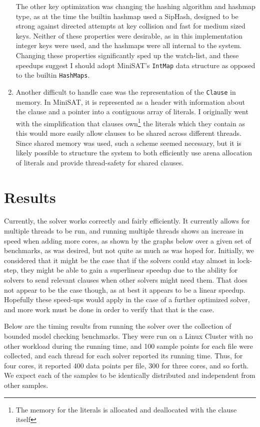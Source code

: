 \documentclass[11pt]{extarticle}
\begin{document}
\begin{enumerate}
The other key optimization was changing the hashing algorithm and hashmap type, as at the time
the builtin hashmap used a SipHash, designed to be strong against directed attempts at key
collision and fast for medium sized keys. Neither of these properties were desirable, as in this
implementation integer keys were used, and the hashmaps were all internal to the system.
Changing these properties significantly sped up the watch-list, and these speedups suggest I
should adopt MiniSAT's \texttt{IntMap} data structure as opposed to the builtin \texttt{HashMaps}.
\item
Another difficult to handle case was the representation of the \texttt{Clause} in memory. In
MiniSAT, it is represented as a header with information about the clause and a pointer into a
contiguous array of literals. I originally went with the simplification that clauses
own\footnote{The memory for the literals is allocated and deallocated with the clause itself} the
literals which they contain as this would more easily allow clauses to be shared across
different threads. Since shared memory was used, such a scheme seemed necessary, but it is
likely possible to structure the system to both efficiently use arena allocation of literals
and provide thread-safety for shared clauses.
\end{enumerate}
\section*{Results}
Currently, the solver works correctly and fairly efficiently. It currently allows for multiple
threads to be run, and running multiple threads shows an increase in speed when adding more
cores, as shown by the graphs below over a given set of benchmarks, as was desired, but not
quite as much as was hoped for. Initially, we considered that it might be the case that if the
solvers could stay almost in lock-step, they might be able to gain a superlinear speedup due to
the ability for solvers to send relevant clauses when other solvers might need them. That does
not appear to be the case though, as at best it appears to be a linear speedup. Hopefully these
speed-ups would apply in the case of a further optimized solver, and more work must be done in
order to verify that that is the case.

Below are the timing results from running the solver over the collection of bounded model
checking benchmarks. They were run on a Linux Cluster with no other workload during the running
time, and 100 sample points for each file were collected, and each thread for each solver
reported its running time. Thus, for four cores, it reported 400 data points per file, 300 for
three cores, and so forth. We expect each of the samples to be identically distributed and
independent from other samples.
\end{document}
